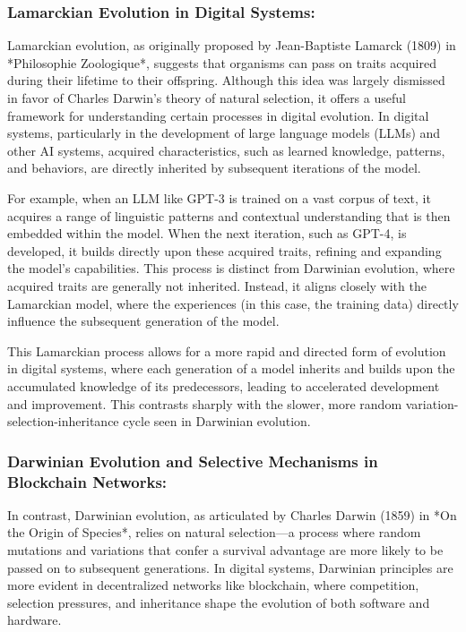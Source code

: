 \documentclass[12pt,twoside]{article}
\begin{document}
\subsubsection{Lamarckian Evolution in Digital Systems:}

Lamarckian evolution, as originally proposed by Jean-Baptiste Lamarck (1809) in *Philosophie Zoologique*, suggests that organisms can pass on traits acquired during their lifetime to their offspring. Although this idea was largely dismissed in favor of Charles Darwin’s theory of natural selection, it offers a useful framework for understanding certain processes in digital evolution. In digital systems, particularly in the development of large language models (LLMs) and other AI systems, acquired characteristics, such as learned knowledge, patterns, and behaviors, are directly inherited by subsequent iterations of the model.

For example, when an LLM like GPT-3 is trained on a vast corpus of text, it acquires a range of linguistic patterns and contextual understanding that is then embedded within the model. When the next iteration, such as GPT-4, is developed, it builds directly upon these acquired traits, refining and expanding the model's capabilities. This process is distinct from Darwinian evolution, where acquired traits are generally not inherited. Instead, it aligns closely with the Lamarckian model, where the experiences (in this case, the training data) directly influence the subsequent generation of the model.

This Lamarckian process allows for a more rapid and directed form of evolution in digital systems, where each generation of a model inherits and builds upon the accumulated knowledge of its predecessors, leading to accelerated development and improvement. This contrasts sharply with the slower, more random variation-selection-inheritance cycle seen in Darwinian evolution.

\subsubsection{Darwinian Evolution and Selective Mechanisms in Blockchain Networks:}

In contrast, Darwinian evolution, as articulated by Charles Darwin (1859) in *On the Origin of Species*, relies on natural selection—a process where random mutations and variations that confer a survival advantage are more likely to be passed on to subsequent generations. In digital systems, Darwinian principles are more evident in decentralized networks like blockchain, where competition, selection pressures, and inheritance shape the evolution of both software and hardware.
\end{document}
